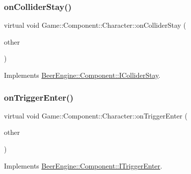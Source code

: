 \subsubsection{\texorpdfstring{on\+Collider\+Stay()}{onColliderStay()}}
{\footnotesize\ttfamily virtual void Game\+::\+Component\+::\+Character\+::on\+Collider\+Stay (\begin{DoxyParamCaption}\item[{\mbox{\hyperlink{class_beer_engine_1_1_component_1_1_a_collider}{Beer\+Engine\+::\+Component\+::\+A\+Collider}} $\ast$}]{other }\end{DoxyParamCaption})\hspace{0.3cm}{\ttfamily [virtual]}}



Implements \mbox{\hyperlink{class_beer_engine_1_1_component_1_1_i_collider_stay_a462a0eb147235000265ed3f29d8b343e}{Beer\+Engine\+::\+Component\+::\+I\+Collider\+Stay}}.

\mbox{\label{class_game_1_1_component_1_1_character_a69ff22151cf9599aab5cbe6929505c8e}} 
\subsubsection{\texorpdfstring{on\+Trigger\+Enter()}{onTriggerEnter()}}
{\footnotesize\ttfamily virtual void Game\+::\+Component\+::\+Character\+::on\+Trigger\+Enter (\begin{DoxyParamCaption}\item[{\mbox{\hyperlink{class_beer_engine_1_1_component_1_1_a_collider}{Beer\+Engine\+::\+Component\+::\+A\+Collider}} $\ast$}]{other }\end{DoxyParamCaption})\hspace{0.3cm}{\ttfamily [virtual]}}



Implements \mbox{\hyperlink{class_beer_engine_1_1_component_1_1_i_trigger_enter_aab0d007cc2a256bc5aa542cd7dfdeef0}{Beer\+Engine\+::\+Component\+::\+I\+Trigger\+Enter}}.

\mbox{\label{class_game_1_1_component_1_1_character_a1acc86ac5340ef65ba18d755f1ea37f9}} 
